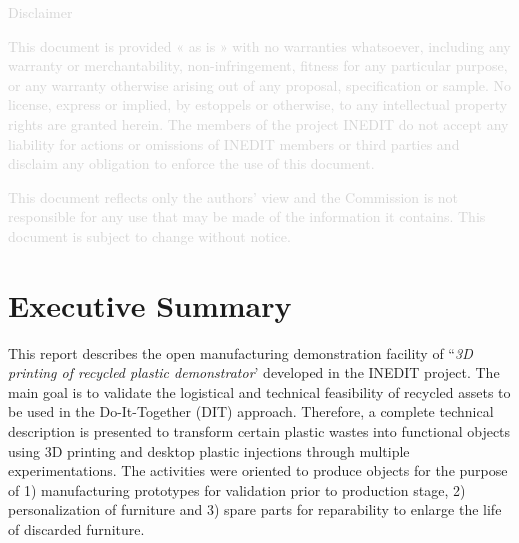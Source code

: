 \documentclass[
  11pt,
]{article}
\renewcommand*\contentsname{Table of contents}
\newcommand\contentsname{Table of contents}
\begin{document}
\vfill

\begin{center}
\textcolor{lightgray}{Disclaimer}

\textcolor{lightgray}{
\small
This document is provided « as is » with no warranties whatsoever, including any warranty or merchantability, non-infringement, fitness for any particular purpose, or any warranty otherwise arising out of any proposal, specification or sample.  No license, express or implied, by estoppels or otherwise, to any intellectual property rights are granted herein. The members of the project INEDIT do not accept any liability for actions or omissions of INEDIT members or third parties and disclaim any obligation to enforce the use of this document. }

\textcolor{lightgray}{
This document reflects only the authors' view and the Commission is not responsible for any use that may be made of the information it contains.  This document is subject to change without notice. 
}
\end{center}
\normalsize

\newpage

\ifdefined\Shaded\renewenvironment{Shaded}{\begin{tcolorbox}[interior hidden, enhanced, breakable, frame hidden, borderline west={3pt}{0pt}{shadecolor}, sharp corners, boxrule=0pt]}{\end{tcolorbox}}\fi

\renewcommand*\contentsname{Table of contents}
{
\hypersetup{linkcolor=}
\setcounter{tocdepth}{3}
\tableofcontents
}
\newpage

\bgroup
\hypersetup{linkcolor = black}
\listoffigures
\egroup

\color{darkgray}

\newpage

\hypertarget{executive-summary}{%
\section{Executive Summary}\label{executive-summary}}

This report describes the open manufacturing demonstration facility of
``\emph{3D printing of recycled plastic demonstrator}' developed in the
INEDIT project. The main goal is to validate the logistical and
technical feasibility of recycled assets to be used in the
Do-It-Together (DIT) approach. Therefore, a complete technical
description is presented to transform certain plastic wastes into
functional objects using 3D printing and desktop plastic injections
through multiple experimentations. The activities were oriented to
produce objects for the purpose of 1) manufacturing prototypes for
validation prior to production stage, 2) personalization of furniture
and 3) spare parts for reparability to enlarge the life of discarded
furniture.
\end{document}
